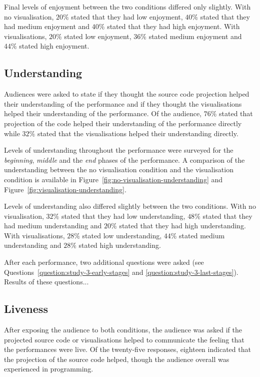 Final levels of enjoyment between the two conditions differed only slightly. With no visualisation, $20\%$ stated that they had low enjoyment, $40\%$ stated that they had medium enjoyment and $40\%$ stated that they had high enjoyment. With visualisations, $20\%$ stated low enjoyment, $36\%$ stated medium enjoyment and $44\%$ stated high enjoyment.

\subsection{Understanding}



Audiences were asked to state if they thought the source code projection helped their understanding of the performance and if they thought the visualisations helped their understanding of the performance. Of the audience, $76\%$ stated that projection of the code helped their understanding of the performance directly while $32\%$ stated that the visualisations helped their understanding directly.

Levels of understanding throughout the performance were surveyed for the \emph{beginning}, \emph{middle} and the \emph{end} phases of the performance. A comparison of the understanding between the no visualisation condition and the visualisation condition is available in Figure~\ref{fig:no-visualisation-understanding} and Figure~\ref{fig:visualisation-understanding}.

Levels of understanding also differed slightly between the two conditions. With no visualisation, $32\%$ stated that they had low understanding, $48\%$ stated that they had medium understanding and $20\%$ stated that they had high understanding. With visualisations, $28\%$ stated low understanding, $44\%$ stated medium understanding and $28\%$ stated high understanding.

After each performance, two additional questions were asked (see Questions~\ref{question:study-3-early-stages} and \ref{question:study-3-last-stages}). Results of these questions... \more

\subsection{Liveness}

After exposing the audience to both conditions, the audience was asked if the projected source code or visualisations helped to communicate the feeling that the performances were live. Of the twenty-five responses, eighteen indicated that the projection of the source code helped, though the audience overall was experienced in programming. 

